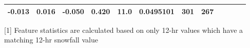 \documentclass[11pt]{article}
\begin{document}
\begin{longtable}[]{@{}llllllllllll@{}}
\begin{minipage}[t]{0.04\columnwidth}
-0.013\strut
\end{minipage} & \begin{minipage}[t]{0.05\columnwidth}\raggedright\strut
0.016\strut
\end{minipage} & \begin{minipage}[t]{0.04\columnwidth}\raggedright\strut
-0.050\strut
\end{minipage} & \begin{minipage}[t]{0.04\columnwidth}\raggedright\strut
0.420\strut
\end{minipage} & \begin{minipage}[t]{0.05\columnwidth}\raggedright\strut
11.0\strut
\end{minipage} & \begin{minipage}[t]{0.05\columnwidth}\raggedright\strut
0.0495101\strut
\end{minipage} & \begin{minipage}[t]{0.05\columnwidth}\raggedright\strut
301\strut
\end{minipage} & \begin{minipage}[t]{0.07\columnwidth}\raggedright\strut
267\strut
\end{minipage}\tabularnewline
\bottomrule
\end{longtable}

{[}1{]} Feature statistics are calculated based on only 12-hr values
which have a matching 12-hr snowfall value
\end{document}
